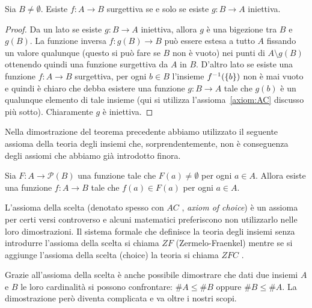 \begin{theorem}\label{th:95444}
  Sia $B\neq \emptyset$.
  Esiste $f\colon A\to B$ surgettiva 
  se e solo se esiste $g\colon B\to A$ iniettiva.
\end{theorem}
% 
\begin{proof}
Da un lato se esiste $g\colon B\to A$ iniettiva, allora $g$ è una bigezione 
tra $B$ e $g(B)$. La funzione inversa $f\colon g(B) \to B$ 
può essere estesa a tutto $A$ fissando un valore qualunque 
(questo si può fare se $B$ non è vuoto) nei punti di $A\setminus g(B)$
ottenendo quindi una funzione surgettiva da $A$ in $B$.
D'altro lato se esiste una funzione $f\colon A\to B$ surgettiva,
per ogni $b\in B$ l'insieme $f^{-1}({\left\{ b \right\}})$ non è mai 
vuoto e quindi è chiaro che debba esistere 
una funzione $g\colon B\to A$ tale che $g(b)$ è un qualunque elemento 
di tale insieme
(qui si utilizza l'assioma~\ref{axiom:AC} discusso più sotto). 
Chiaramente $g$ è iniettiva.
\end{proof}

Nella dimostrazione del teorema precedente abbiamo utilizzato il seguente assioma 
della teoria degli insiemi che, sorprendentemente, non è conseguenza degli assiomi 
che abbiamo già introdotto finora.

\begin{axiom}%
  \label{axiom:AC}%
  Sia $F\colon A \to \mathcal P(B)$
  una funzione tale che $F(a)\neq \emptyset$ 
  per ogni $a\in A$. Allora esiste una funzione
  $f\colon A \to B$ tale che $f(a)\in F(a)$
  per ogni $a\in A$.
\end{axiom}

L'assioma della scelta (denotato spesso con \emph{$AC$}%
%
, \emph{axiom of choice})
è un assioma per certi versi controverso
e alcuni matematici preferiscono non utilizzarlo nelle loro dimostrazioni.
Il sistema formale che definisce la teoria degli insiemi senza 
introdurre l'assioma della scelta 
si chiama \emph{$ZF$}%
%
 (Zermelo-Fraenkel) mentre 
se si aggiunge l'assioma della scelta (choice) la teoria si chiama 
\emph{$ZFC$}%
%
.

Grazie all'assioma della scelta è anche possibile dimostrare 
che dati due insiemi $A$ e $B$ le loro cardinalità
si possono confrontare: $\#A\le \#B$ oppure 
$\#B\le \#A$. 
La dimostrazione però diventa complicata e va oltre i nostri scopi.


